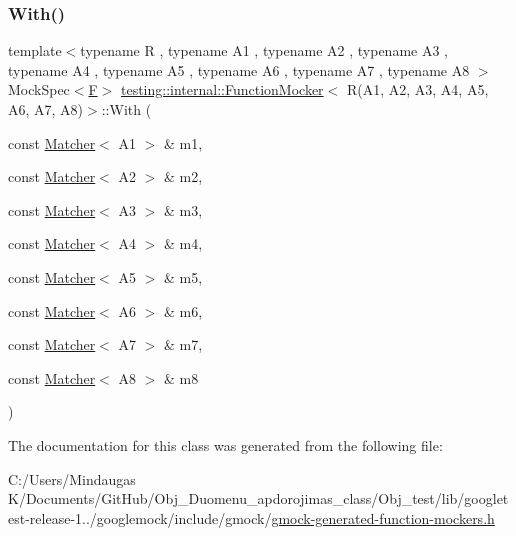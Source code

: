 \subsubsection{\texorpdfstring{With()}{With()}}
{\footnotesize\ttfamily template$<$typename R , typename A1 , typename A2 , typename A3 , typename A4 , typename A5 , typename A6 , typename A7 , typename A8 $>$ \\
Mock\+Spec$<$\mbox{\hyperlink{classtesting_1_1internal_1_1_function_mocker_3_01_r_07_a1_00_01_a2_00_01_a3_00_01_a4_00_01_a5_00_01_a6_00_01_a7_00_01_a8_08_4_ad9749c93b0a17540778c5fa162a5fe6c}{F}}$>$ \mbox{\hyperlink{classtesting_1_1internal_1_1_function_mocker}{testing\+::internal\+::\+Function\+Mocker}}$<$ R(A1, A2, A3, A4, A5, A6, A7, A8)$>$\+::With (\begin{DoxyParamCaption}\item[{const \mbox{\hyperlink{classtesting_1_1_matcher}{Matcher}}$<$ A1 $>$ \&}]{m1,  }\item[{const \mbox{\hyperlink{classtesting_1_1_matcher}{Matcher}}$<$ A2 $>$ \&}]{m2,  }\item[{const \mbox{\hyperlink{classtesting_1_1_matcher}{Matcher}}$<$ A3 $>$ \&}]{m3,  }\item[{const \mbox{\hyperlink{classtesting_1_1_matcher}{Matcher}}$<$ A4 $>$ \&}]{m4,  }\item[{const \mbox{\hyperlink{classtesting_1_1_matcher}{Matcher}}$<$ A5 $>$ \&}]{m5,  }\item[{const \mbox{\hyperlink{classtesting_1_1_matcher}{Matcher}}$<$ A6 $>$ \&}]{m6,  }\item[{const \mbox{\hyperlink{classtesting_1_1_matcher}{Matcher}}$<$ A7 $>$ \&}]{m7,  }\item[{const \mbox{\hyperlink{classtesting_1_1_matcher}{Matcher}}$<$ A8 $>$ \&}]{m8 }\end{DoxyParamCaption})\hspace{0.3cm}{\ttfamily [inline]}}



The documentation for this class was generated from the following file\+:\begin{DoxyCompactItemize}
\item 
C\+:/\+Users/\+Mindaugas K/\+Documents/\+Git\+Hub/\+Obj\+\_\+\+Duomenu\+\_\+apdorojimas\+\_\+class/\+Obj\+\_\+test/lib/googletest-\/release-\/1../googlemock/include/gmock/\mbox{\hyperlink{_obj__test_2lib_2googletest-release-1_88_81_2googlemock_2include_2gmock_2gmock-generated-function-mockers_8h}{gmock-\/generated-\/function-\/mockers.\+h}}\end{DoxyCompactItemize}
